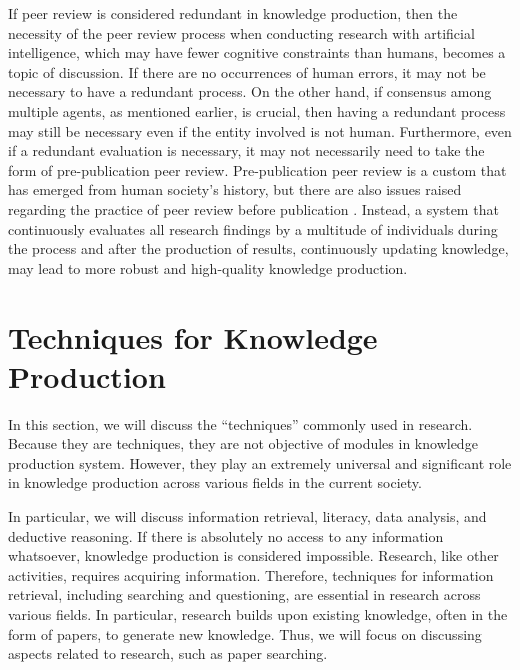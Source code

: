 \documentclass{book}
\begin{document}
If peer review is considered redundant in knowledge production, then the necessity of the peer review process when conducting research with artificial intelligence, which may have fewer cognitive constraints than humans, becomes a topic of discussion. If there are no occurrences of human errors, it may not be necessary to have a redundant process. On the other hand, if consensus among multiple agents, as mentioned earlier, is crucial, then having a redundant process may still be necessary even if the entity involved is not human. Furthermore, even if a redundant evaluation is necessary, it may not necessarily need to take the form of pre-publication peer review. Pre-publication peer review is a custom that has emerged from human society's history, but there are also issues raised regarding the practice of peer review before publication \cite{heesen2021peer}. Instead, a system that continuously evaluates all research findings by a multitude of individuals during the process and after the production of results, continuously updating knowledge, may lead to more robust and high-quality knowledge production.


\section{Techniques for Knowledge Production}
In this section, we will discuss the ``techniques'' commonly used in research. Because they are techniques, they are not objective of modules in knowledge production system. However, they play an extremely universal and significant role in knowledge production across various fields in the current society. 

In particular, we will discuss information retrieval, literacy, data analysis, and deductive reasoning. If there is absolutely no access to any information whatsoever, knowledge production is considered impossible. Research, like other activities, requires acquiring information. Therefore, techniques for information retrieval, including searching and questioning, are essential in research across various fields. In particular, research builds upon existing knowledge, often in the form of papers, to generate new knowledge. Thus, we will focus on discussing aspects related to research, such as paper searching. 
\end{document}
